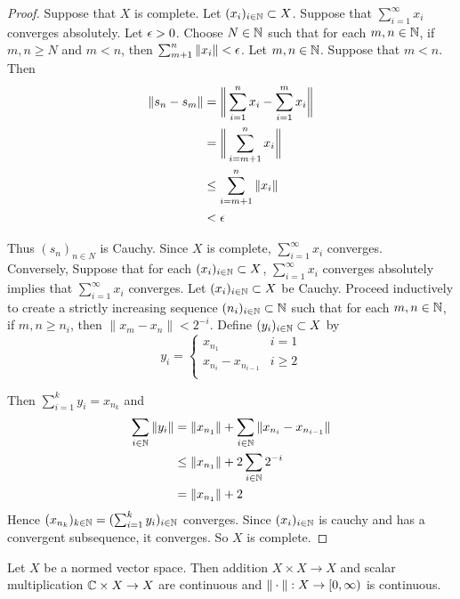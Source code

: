 \documentclass{book}
\begin{document}
	\begin{proof}
		Suppose that $X$ is complete. Let $(x_{i})_{i \in \mathbb{N}} \subset X$. Suppose that $\sum_{i=1}^{\infty}x_i$ converges absolutely. Let $\epsilon >0$. Choose $N \in \mathbb{N}$ such that for each $m,n \in \mathbb{N}$, if $m, n \geq N$ and $m< n$, then $\sum_{m+1}^n \|x_i \|< \epsilon$. Let $m, n \in \mathbb{N}$. Suppose that $m<n$. Then 
		\begin{align*}
			\|s_n-s_m \|
			&= \bigg \|\sum_{i=1}^n x_i -\sum_{i=1}^m x_i\bigg \|\\
			&= \bigg\|\sum_{i=m+1}^{n} x_i \bigg \| \\
			& \leq \sum_{i=m+1}^n \|x_i \|\\
			& < \epsilon
		\end{align*}
		
		Thus $(s_n)_{n \in N}$ is Cauchy. Since $X$ is complete, $\sum_{i=1}^{\infty}x_i$ converges. \\
		Conversely, Suppose that for each $(x_{i})_{i \in \mathbb{N}} \subset X$, $\sum_{i =1}^{\infty}x_i$ converges absolutely implies that $\sum_{i=1}^{\infty}x_i$ converges. Let $(x_{i})_{i \in \mathbb{N}} \subset X$ be Cauchy. Proceed inductively to create a strictly increasing sequence $(n_i)_{i \in \mathbb{N}} \subset \mathbb{N}$ such that for each $m, n \in \mathbb{N}$, if $m,n \geq n_i$, then $ \|x_m-x_n \|< 2^{-i}$. Define $(y_i)_{i \in \mathbb{N}} \subset X$ by 
		\[ y_i = \begin{cases}
			x_{n_1} & i=1 \\
			x_{n_i} - x_{n_{i-1}} & i \geq 2\\
		\end{cases}\]
		
		Then $\sum_{i=1}^k y_i = x_{n_k}$ and 
		\begin{align*}
			\sum_{i \in \mathbb{N}} \|y_i \|
			&= \|x_{n_1} \|+ \sum_{i \in \mathbb{N}} \|x_{n_i}-x_{n_{i-1}} \|\\
			& \leq \|x_{n_1} \|+ 2\sum_{i \in \mathbb{N}}2^{-i}\\
			& = \|x_{n_1} \|+2
		\end{align*}
		Hence $(x_{n_k})_{k \in \mathbb{N}} = (\sum_{i=1}^k y_i)_{i\in \mathbb{N}}$ converges. Since $(x_i)_{i \in \mathbb{N}}$ is cauchy and has a convergent subsequence, it converges. So $X$ is complete.
	\end{proof}
	
	\begin{ex} \lex{}
		Let $X$ be a normed vector space. Then addition $X \times X \rightarrow X$ and scalar multiplication $\mathbb{C} \times X \rightarrow X$ are continuous and $\|\cdot \|:X \rightarrow [0,\infty)$ is continuous.
	\end{ex}
	
\end{document}
